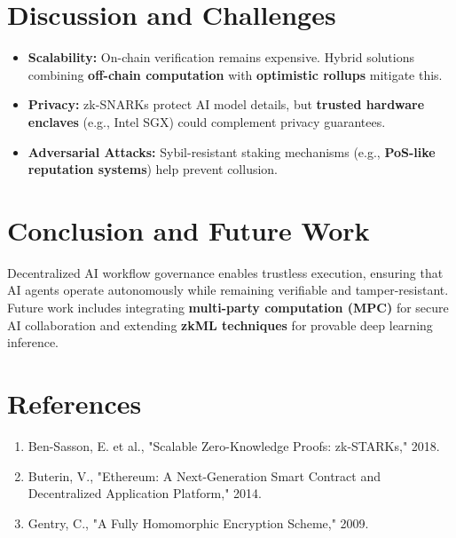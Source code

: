 \documentclass{article}
\begin{document}
\section{Discussion and Challenges}
\begin{itemize}
    \item \textbf{Scalability:} On-chain verification remains expensive. Hybrid solutions combining \textbf{off-chain computation} with \textbf{optimistic rollups} mitigate this.
    \item \textbf{Privacy:} zk-SNARKs protect AI model details, but \textbf{trusted hardware enclaves} (e.g., Intel SGX) could complement privacy guarantees.
    \item \textbf{Adversarial Attacks:} Sybil-resistant staking mechanisms (e.g., \textbf{PoS-like reputation systems}) help prevent collusion.
\end{itemize}

\section{Conclusion and Future Work}
Decentralized AI workflow governance enables trustless execution, ensuring that AI agents operate autonomously while remaining verifiable and tamper-resistant. Future work includes integrating \textbf{multi-party computation (MPC)} for secure AI collaboration and extending \textbf{zkML techniques} for provable deep learning inference.

\section{References}
\begin{enumerate}
    \item Ben-Sasson, E. et al., "Scalable Zero-Knowledge Proofs: zk-STARKs," 2018.
    \item Buterin, V., "Ethereum: A Next-Generation Smart Contract and Decentralized Application Platform," 2014.
    \item Gentry, C., "A Fully Homomorphic Encryption Scheme," 2009.
\end{enumerate}
\end{document}

